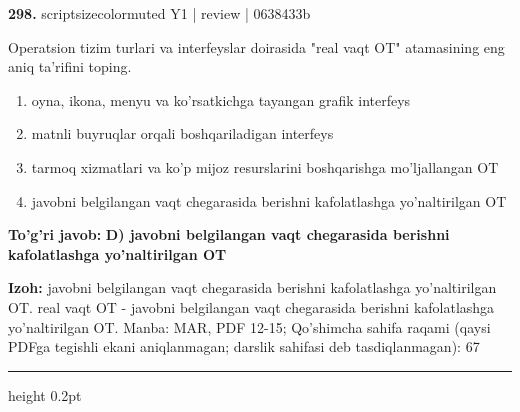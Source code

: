\documentclass[10pt,a4paper]{article}
\begin{document}
{\bfseries\sffamily\color{ink} 298.} {scriptsizecolor{muted} Y1 | review | 0638433b}
\par
Operatsion tizim turlari va interfeyslar doirasida "real vaqt OT" atamasining eng aniq ta'rifini toping.
\begin{enumerate}[label=\Alph*),leftmargin=9mm]
\item oyna, ikona, menyu va ko'rsatkichga tayangan grafik interfeys
\item matnli buyruqlar orqali boshqariladigan interfeys
\item tarmoq xizmatlari va ko'p mijoz resurslarini boshqarishga mo'ljallangan OT
\item javobni belgilangan vaqt chegarasida berishni kafolatlashga yo'naltirilgan OT
\end{enumerate}
\begin{tcolorbox}[enhanced,breakable,colback=teal!4,colframe=teal!60!black,boxrule=0.45pt,arc=1.2mm,left=2.7mm,right=2.7mm,top=1.8mm,bottom=1.8mm,before skip=2mm,after skip=2mm]
{\bfseries\sffamily\color{teal}To'g'ri javob:} \textbf{D) javobni belgilangan vaqt chegarasida berishni kafolatlashga yo'naltirilgan OT}
\par\smallskip
{\bfseries Izoh:} javobni belgilangan vaqt chegarasida berishni kafolatlashga yo'naltirilgan OT. real vaqt OT - javobni belgilangan vaqt chegarasida berishni kafolatlashga yo'naltirilgan OT. Manba: MAR, PDF 12-15; Qo'shimcha sahifa raqami (qaysi PDFga tegishli ekani aniqlanmagan; darslik sahifasi deb tasdiqlanmagan): 67
\end{tcolorbox}
\vspace{2mm}\hrule height 0.2pt\vspace{3mm}
\end{document}
